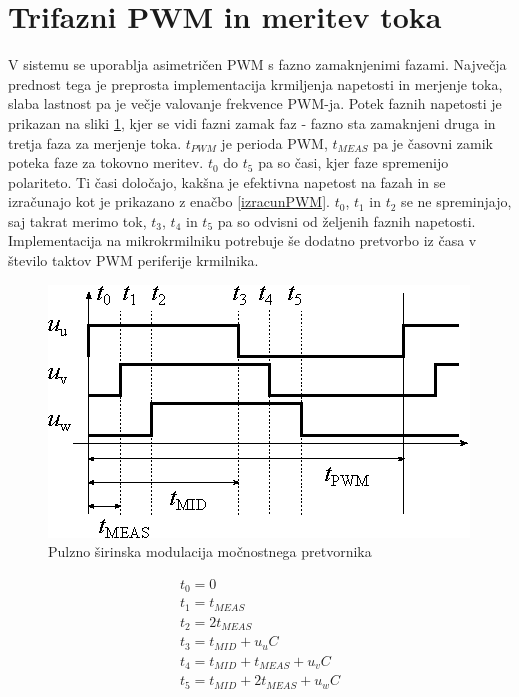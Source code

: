 \documentclass[a4paper,twoside,openright,12pt,slovene]{book}
\begin{document}
\section{Trifazni PWM in meritev toka}

V sistemu se uporablja asimetričen PWM s fazno zamaknjenimi fazami. Največja prednost tega je preprosta implementacija krmiljenja napetosti in merjenje toka, slaba lastnost pa je večje valovanje
frekvence PWM-ja. Potek faznih napetosti je prikazan na sliki \ref{PWM}, kjer se vidi fazni zamak faz - fazno sta zamaknjeni druga in tretja faza za merjenje toka. $t_{PWM}$ je perioda PWM, $t_{MEAS}$
pa je časovni zamik poteka faze za tokovno meritev. $t_0$ do $t_5$ pa so časi, kjer faze spremenijo polariteto. Ti časi določajo, kakšna je efektivna napetost na fazah in se izračunajo kot je
prikazano z enačbo \ref{izracunPWM}. $t_0$, $t_1$ in $t_2$ se ne spreminjajo, saj takrat merimo tok, $t_3$, $t_4$ in $t_5$ pa so odvisni od željenih faznih napetosti. Implementacija na mikrokrmilniku
potrebuje še dodatno pretvorbo iz časa v število taktov PWM periferije krmilnika.

\begin{figure}[!htbp]
    \centering
    \includegraphics[width=1\columnwidth]{Slike/Inkscape/PWM.eps}
    \caption{\label{PWM} Pulzno širinska modulacija močnostnega pretvornika }
\end{figure}

\begin{equation} \label{izracunPWM}
\begin{gathered}
    t_0 = 0  \\
    t_1 = t_{MEAS}  \\
    t_2 = 2t_{MEAS}  \\
    t_3 = t_{MID} + u_uC  \\
    t_4 = t_{MID} + t_{MEAS} + u_vC \\
    t_5 = t_{MID} + 2t_{MEAS} + u_wC
\end{gathered}
\end{equation}
\end{document}
